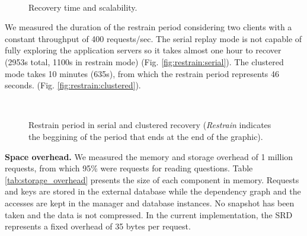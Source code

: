 \begin{figure}[tbh]
\vspace{-5mm}
  \LARGE
  \mbox{
  }
  \caption{Recovery time and scalability.}
  \vspace{-3mm}
\end{figure}

We measured the duration of the restrain period considering two clients with a constant throughput of 400 requests/sec. The serial replay mode is not capable of fully exploring the application servers so it takes almost one hour to recover (2953s total, 1100s in restrain mode) (Fig. \ref{fig:restrain:serial}). The clustered mode takes 10 minutes (635s), from which the restrain period represents 46 seconds. (Fig. \ref{fig:restrain:clustered}).

\begin{figure}[tbh]
\vspace{-5mm}
  \LARGE
  \mbox{
  }
  \caption{Restrain period in serial and clustered recovery (\emph{Restrain} indicates the beggining of the period that ends at the end of the graphic).}
  \vspace{-3mm}
\end{figure}


\textbf{Space overhead.}
We measured the memory and storage overhead of 1 million requests, from which 95\% were requests for reading questions. Table \ref{tab:storage_overhead} presents the size of each component in memory. Requests and keys are stored in the external database while the dependency graph and the accesses are kept in the manager and database instances. No snapshot has been taken and the data is not compressed.
%
In the current implementation, the \ac{SRD} represents a fixed overhead of 35 bytes per request.

